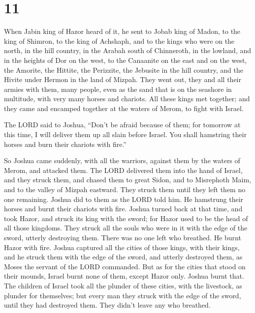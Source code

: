 \hypertarget{section-10}{%
\section{11}\label{section-10}}

 When Jabin king of Hazor heard of it, he sent to Jobab
king of Madon, to the king of Shimron, to the king of Achshaph,
 and to the kings who were on the north, in the hill
country, in the Arabah south of Chinneroth, in the lowland, and in the
heights of Dor on the west,  to the Canaanite on the east
and on the west, the Amorite, the Hittite, the Perizzite, the Jebusite
in the hill country, and the Hivite under Hermon in the land of Mizpah.
 They went out, they and all their armies with them, many
people, even as the sand that is on the seashore in multitude, with very
many horses and chariots.  All these kings met together;
and they came and encamped together at the waters of Merom, to fight
with Israel.

 The LORD said to Joshua, ``Don't be afraid because of
them; for tomorrow at this time, I will deliver them up all slain before
Israel. You shall hamstring their horses and burn their chariots with
fire.''

 So Joshua came suddenly, with all the warriors, against
them by the waters of Merom, and attacked them.  The LORD
delivered them into the hand of Israel, and they struck them, and chased
them to great Sidon, and to Misrephoth Maim, and to the valley of Mizpah
eastward. They struck them until they left them no one remaining.
 Joshua did to them as the LORD told him. He hamstrung
their horses and burnt their chariots with fire.  Joshua
turned back at that time, and took Hazor, and struck its king with the
sword; for Hazor used to be the head of all those kingdoms.
 They struck all the souls who were in it with the edge
of the sword, utterly destroying them. There was no one left who
breathed. He burnt Hazor with fire.  Joshua captured all
the cities of those kings, with their kings, and he struck them with the
edge of the sword, and utterly destroyed them, as Moses the servant of
the LORD commanded.  But as for the cities that stood on
their mounds, Israel burnt none of them, except Hazor only. Joshua burnt
that.  The children of Israel took all the plunder of
these cities, with the livestock, as plunder for themselves; but every
man they struck with the edge of the sword, until they had destroyed
them. They didn't leave any who breathed.

